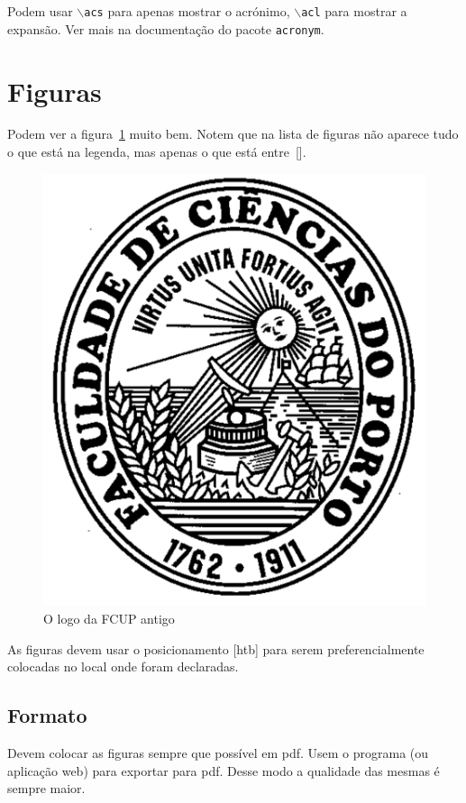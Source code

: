 Podem usar $\backslash$\texttt{acs} para apenas mostrar o acrónimo, 
$\backslash$\texttt{acl} para mostrar a expansão. Ver mais na documentação do 
pacote \texttt{acronym}.

\section{Figuras}

Podem ver a figura~\ref{fig:logoFCUP} muito bem. Notem que na lista de figuras não aparece tudo o que está na legenda, mas apenas o que está entre~[].

\begin{figure}[htb]
   \centering %
   \includegraphics[scale=.4]{pics/fc_logo}
   \caption[FCUP logo velho]{O logo da FCUP antigo}\label{fig:logoFCUP}
\end{figure}

As figuras devem usar o posicionamento [htb] para serem preferencialmente colocadas no local onde foram declaradas.

\subsection{Formato}
    Devem colocar as figuras sempre que possível em pdf. Usem o programa (ou aplicação web) para exportar para pdf. Desse modo a qualidade das mesmas é sempre maior.

